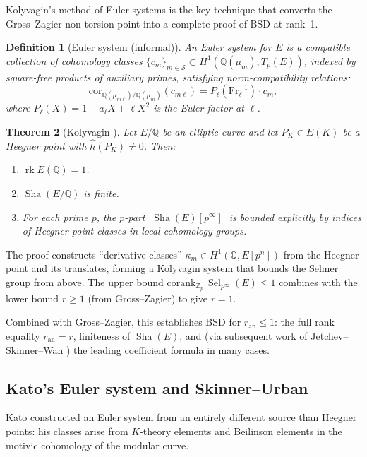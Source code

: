 \documentclass[11pt]{article}
\newtheorem{theorem}{Theorem}[section]
\newtheorem{definition}[theorem]{Definition}
\DeclareMathOperator{\rk}{rk}
\DeclareMathOperator{\Sha}{Sha}
\DeclareMathOperator{\Sel}{Sel}
\begin{document}
Kolyvagin's method of Euler systems \cite{Koly} is the key technique that
converts the Gross--Zagier non-torsion point into a complete proof of BSD at
rank~1.

\begin{definition}[Euler system (informal)]
An \emph{Euler system} for $E$ is a compatible collection of cohomology classes
$\{c_m\}_{m \in \mathcal{S}} \subset H^1(\mathbb{Q}(\mu_m), T_p(E))$, indexed
by square-free products of auxiliary primes, satisfying norm-compatibility
relations:
\[
  \mathrm{cor}_{\mathbb{Q}(\mu_{m\ell})/\mathbb{Q}(\mu_m)}(c_{m\ell})
  = P_\ell(\mathrm{Fr}_\ell^{-1}) \cdot c_m,
\]
where $P_\ell(X) = 1 - a_\ell X + \ell X^2$ is the Euler factor at $\ell$.
\end{definition}

\begin{theorem}[Kolyvagin \cite{Koly}]
\label{thm:kolyvagin}
Let $E/\mathbb{Q}$ be an elliptic curve and let $P_K \in E(K)$ be a Heegner
point with $\hat{h}(P_K) \neq 0$.  Then:
\begin{enumerate}
  \item $\rk E(\mathbb{Q}) = 1$.
  \item $\Sha(E/\mathbb{Q})$ is finite.
  \item For each prime $p$, the $p$-part $|\Sha(E)[p^\infty]|$ is bounded
    explicitly by indices of Heegner point classes in local cohomology groups.
\end{enumerate}
\end{theorem}

\noindent
The proof constructs ``derivative classes'' $\kappa_m \in H^1(\mathbb{Q},
E[p^n])$ from the Heegner point and its translates, forming a Kolyvagin system
that bounds the Selmer group from above.  The upper bound
$\mathrm{corank}_{\mathbb{Z}_p}\, \Sel_{p^\infty}(E) \leq 1$ combines with the
lower bound $r \geq 1$ (from Gross--Zagier) to give $r = 1$.

Combined with Gross--Zagier, this establishes BSD for $r_{\mathrm{an}} \leq 1$:
the full rank equality $r_{\mathrm{an}} = r$, finiteness of $\Sha(E)$, and
(via subsequent work of Jetchev--Skinner--Wan \cite{JSW}) the leading
coefficient formula in many cases.

\subsection{Kato's Euler system and Skinner--Urban}

Kato \cite{Kato} constructed an Euler system from an entirely different source
than Heegner points: his classes arise from $K$-theory elements and Beilinson
elements in the motivic cohomology of the modular curve.
\end{document}
